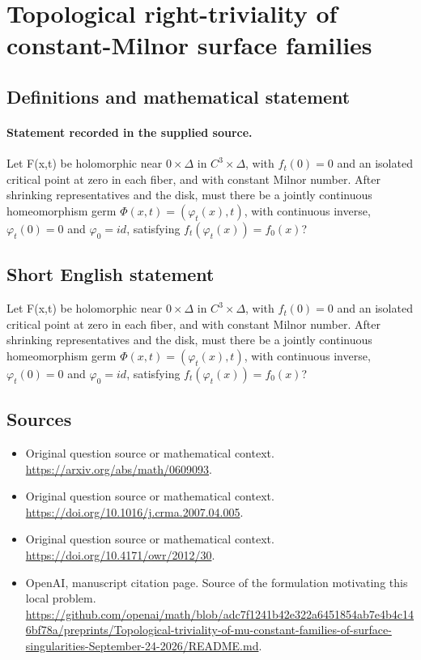 \documentclass[11pt]{article}
\begin{document}
\section*{Topological right-triviality of constant-Milnor surface families}\label{statement}
\subsection{Definitions and mathematical statement}
\paragraph{Statement recorded in the supplied source.}
Let F(x,t) be holomorphic near ${0}×\Delta $ in $C^{3}×\Delta $, with $f_t(0)=0$ and an isolated critical point at zero in each fiber, and with constant Milnor number. After shrinking representatives and the disk, must there be a jointly continuous homeomorphism germ $\Phi (x,t)=(\varphi _t(x),t)$, with continuous inverse, $\varphi _t(0)=0$ and $\varphi _{0}=id$, satisfying $f_t(\varphi _t(x))=f_{0}(x)$?
\subsection{Short English statement}
Let F(x,t) be holomorphic near ${0}×\Delta $ in $C^{3}×\Delta $, with $f_t(0)=0$ and an isolated critical point at zero in each fiber, and with constant Milnor number. After shrinking representatives and the disk, must there be a jointly continuous homeomorphism germ $\Phi (x,t)=(\varphi _t(x),t)$, with continuous inverse, $\varphi _t(0)=0$ and $\varphi _{0}=id$, satisfying $f_t(\varphi _t(x))=f_{0}(x)$?
\subsection{Sources}
\begin{itemize}
\item[S1] Original question source or mathematical context.
\url{https://arxiv.org/abs/math/0609093}.
\item[S2] Original question source or mathematical context.
\url{https://doi.org/10.1016/j.crma.2007.04.005}.
\item[S3] Original question source or mathematical context.
\url{https://doi.org/10.4171/owr/2012/30}.
\item[S4] OpenAI, manuscript citation page. Source of the formulation motivating this local problem.
\url{https://github.com/openai/math/blob/adc7f1241b42e322a6451854ab7e4b4c146bf78a/preprints/Topological-triviality-of-mu-constant-families-of-surface-singularities-September-24-2026/README.md}.
\end{itemize}
\end{document}
